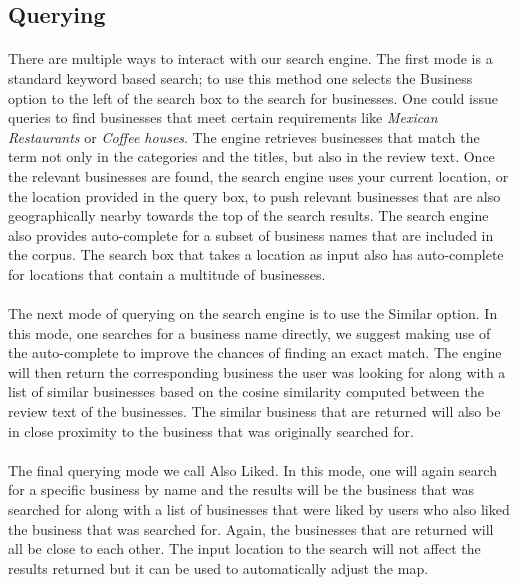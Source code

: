 \documentclass[paper=letter, fontsize=15pt]{article} %
\begin{document}
\subsection{Querying}
\paragraph{}There are multiple ways to interact with our search engine. The first mode is a standard keyword based search; to use this method one selects the Business option to the left of the search box to the search for businesses. One could issue queries to find businesses that meet certain requirements like \textit{Mexican Restaurants} or \textit{Coffee houses}. The engine retrieves businesses that match the term not only in the categories and the titles, but also in the review text. Once the relevant businesses are found, the search engine uses your current location, or the location provided in the query box, to push relevant businesses that are also geographically nearby towards the top of the search results. The search engine also provides auto-complete for a subset of business names that are included in the corpus. The search box that takes a location as input also has auto-complete for locations that contain a multitude of businesses. 

\paragraph{}The next mode of querying on the search engine is to use the Similar option. In this mode, one searches for a business name directly, we suggest making use of the auto-complete to improve the chances of finding an exact match. The engine will then return the corresponding business the user was looking for along with a list of similar businesses based on the cosine similarity computed between the review text of the businesses. The similar business that are returned will also be in close proximity to the business that was originally searched for.

\paragraph{}The final querying mode we call Also Liked. In this mode, one will again search for a specific business by name and the results will be the business that was searched for along with a list of businesses that were liked by users who also liked the business that was searched for. Again, the businesses that are returned will all be close to each other. The input location to the search will not affect the results returned but it can be used to automatically adjust the map.
 
\end{document}
